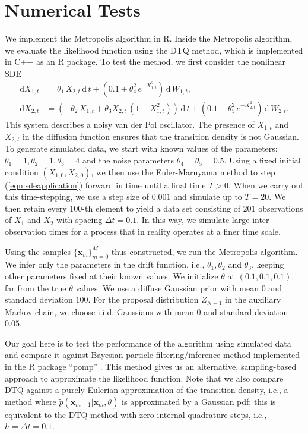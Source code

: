 \documentclass[graybox]{svmult}
\begin{document}
\section{Numerical Tests}
\label{sec:3}
We implement the Metropolis algorithm in R. Inside the Metropolis algorithm, we evaluate the likelihood function using the DTQ method, which is implemented in C++ as an R package. 
To test the method, we first consider the nonlinear SDE
\begin{subequations}
\label{eqn:sdeapplication}
\begin{align}
\mathrm{d}X_{1,t} & =  \theta_1 \, X_{2,t} \, \mathrm{d} \, t + (0.1 + \theta_4^2 \, e^{-X_{1,t}^2}) \, \mathrm{d} \, W_{1,t}, \\
\mathrm{d}X_{2,t} & = (-\theta_2 \, X_{1,t} + \theta_3 X_{2,t} \, (1 - X_{1,t}^2)) \, \mathrm{d} \, t + (0.1 + \theta_5^2 \, e^{-X_{2,t}^2}) \, \mathrm{d} \, W_{2,t}.
\end{align}
\end{subequations}
This system describes a noisy van der Pol oscillator. The presence of $X_{1,t}$ and $X_{2,t}$ in the diffusion function ensures that the transition density is not Gaussian.  To generate simulated data, we start with known values of the parameters: $\theta_1 = 1, \theta_2 = 1, \theta_3 = 4$ and the noise parameters $\theta_4 =  \theta_5 = 0.5$. Using a fixed initial condition $(X_{1,0},X_{2,0})$, we then use the Euler-Maruyama method to step (\ref{eqn:sdeapplication}) forward in time until a final time $T > 0$. When we carry out this time-stepping, we use a step size of $0.001$ and simulate up to $T = 20$.  We then retain every $100$-th element to yield a data set consisting of $201$ observations of $X_1$ and $X_2$ with spacing $\Delta t = 0.1$.  In this way, we simulate large inter-observation times for a process that in reality operates at a finer time scale.

Using the samples $\{ \mathbf{x}_m \}_{m=0}^M$ thus constructed, we run the Metropolis algorithm.  We infer only the parameters in the drift function, i.e., $\theta_1, \theta_2$ and $\theta_3$, keeping other parameters fixed at their known values. We initialize $\theta$ at $(0.1,0.1,0.1)$, far from the true $\theta$ values. We use a diffuse Gaussian prior with mean $0$ and standard deviation $100$. For the proposal distribution $Z_{N+1}$ in the auxiliary Markov chain, we choose i.i.d. Gaussians with mean $0$ and standard deviation $0.05$.

Our goal here is to test the performance of the algorithm using simulated data and compare it against Bayesian particle filtering/inference method implemented in the R package ``pomp'' \cite{king2016statistical}.  This method gives us an alternative, sampling-based approach to approximate the likelihood function.  Note that we also compare DTQ against a purely Eulerian approximation of the transition density, i.e., a method where $\tilde{p}(\mathbf{x}_{m+1} | \mathbf{x}_m, \theta)$ is approximated by a Gaussian pdf; this is equivalent to the DTQ method with zero internal quadrature steps, i.e., $h = \Delta t = 0.1$.
\end{document}
